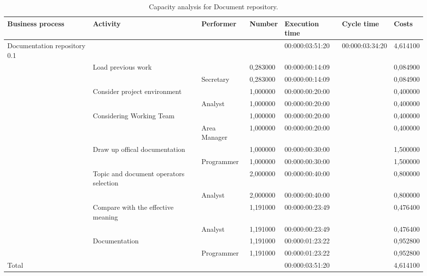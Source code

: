 \begin{landscape}
\begin{table}
\centering
{\tiny
\begin{tabular}{|l|l|l|l|l|l|l|}
Business process&Activity&Performer&Number&Execution time&Cycle time&Costs\\
\hline
Documentation repository 0.1&&&&00:000:03:51:20&00:000:03:34:20&4,614100\\
\hline
&Load previous work &&0,283000&00:000:00:14:09&&0,084900\\
\hline
&&Secretary &0,283000&00:000:00:14:09&&0,084900\\
\hline
&Consider project environment &&1,000000&00:000:00:20:00&&0,400000\\
\hline
&&Analyst &1,000000&00:000:00:20:00&&0,400000\\
\hline
&Considering Working Team &&1,000000&00:000:00:20:00&&0,400000\\
\hline
&&Area Manager &1,000000&00:000:00:20:00&&0,400000\\
\hline
&Draw up offical documentation &&1,000000&00:000:00:30:00&&1,500000\\
\hline
&&Programmer &1,000000&00:000:00:30:00&&1,500000\\
\hline
&Topic and document operators selection  &&2,000000&00:000:00:40:00&&0,800000\\
\hline
&&Analyst &2,000000&00:000:00:40:00&&0,800000\\
\hline
&Compare with the effective meaning &&1,191000&00:000:00:23:49&&0,476400\\
\hline
&&Analyst &1,191000&00:000:00:23:49&&0,476400\\
\hline
&Documentation &&1,191000&00:000:01:23:22&&0,952800\\
\hline
&&Programmer &1,191000&00:000:01:23:22&&0,952800\\
\hline
Total&&&&00:000:03:51:20&&4,614100
\end{tabular}
}
\caption{Capacity analysis for Document repository.}
\end{table}
\end{landscape}
%

%
